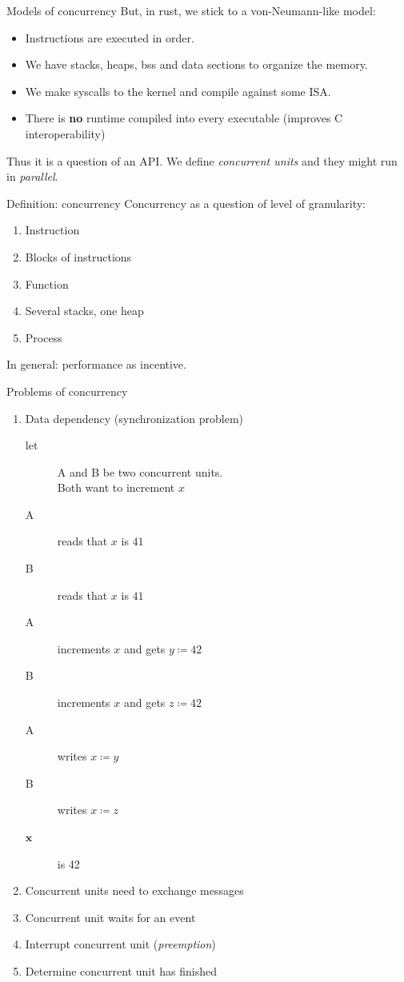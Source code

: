 \documentclass{beamer}
\begin{document}
\begin{frame}[fragile]{Models of concurrency}
  But, in rust, we stick to a von-Neumann-like model:
  \begin{itemize}
    \item Instructions are executed in order.
    \item We have stacks, heaps, bss and data sections to organize the memory.
    \item We make syscalls to the kernel and compile against some ISA.
    \item There is \textbf{no} runtime compiled into every executable (improves C interoperability)
  \end{itemize}
  Thus it is a question of an API. We define \emph{concurrent units} and they might run in \emph{parallel}.
\end{frame}

\begin{frame}[fragile]{Definition: concurrency}
  Concurrency as a question of level of granularity:
  \begin{enumerate}
    \item Instruction
    \item Blocks of instructions
    \item Function
    \item Several stacks, one heap
    \item Process
  \end{enumerate}
  In general: performance as incentive.
\end{frame}

\begin{frame}[fragile]{Problems of concurrency}
  \begin{enumerate}
    \item Data dependency (synchronization problem)
      \begin{description}
        \item[let] A and B be two concurrent units. \\
          Both want to increment $x$
        \item[A] reads that $x$ is $41$
        \item[B] reads that $x$ is $41$
        \item[A] increments $x$ and gets $y \coloneqq 42$
        \item[B] increments $x$ and gets $z \coloneqq 42$
        \item[A] writes $x \coloneqq y$
        \item[B] writes $x \coloneqq z$
        \item[$\mathbf x$] is 42
      \end{description}
    \item Concurrent units need to exchange messages
    \item Concurrent unit waits for an event
    \item Interrupt concurrent unit (\emph{preemption})
    \item Determine concurrent unit has finished
  \end{enumerate}
\end{frame}
\end{document}
